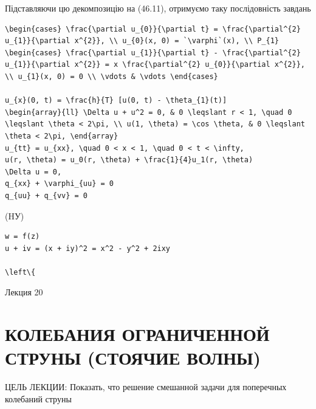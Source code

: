 \documentclass[
  ukrainian,
]{article}
\begin{document}
Підставляючи цю декомпозицію на (46.11), отримуємо таку послідовність
завдань

\begin{verbatim}
\begin{cases} \frac{\partial u_{0}}{\partial t} = \frac{\partial^{2} u_{1}}{\partial x^{2}}, \\ u_{0}(x, 0) = `\varphi`(x), \\ P_{1} \begin{cases} \frac{\partial u_{1}}{\partial t} - \frac{\partial^{2} u_{1}}{\partial x^{2}} = x \frac{\partial^{2} u_{0}}{\partial x^{2}}, \\ u_{1}(x, 0) = 0 \\ \vdots & \vdots \end{cases}

u_{x}(0, t) = \frac{h}{T} [u(0, t) - \theta_{1}(t)]
\begin{array}{ll} \Delta u + u^2 = 0, & 0 \leqslant r < 1, \quad 0 \leqslant \theta < 2\pi, \\ u(1, \theta) = \cos \theta, & 0 \leqslant \theta < 2\pi, \end{array}
u_{tt} = u_{xx}, \quad 0 < x < 1, \quad 0 < t < \infty,
u(r, \theta) = u_0(r, \theta) + \frac{1}{4}u_1(r, \theta)
\Delta u = 0,
q_{xx} + \varphi_{uu} = 0
q_{uu} + q_{vv} = 0
\end{verbatim}

(HУ)

\begin{verbatim}
w = f(z)
u + iv = (x + iy)^2 = x^2 - y^2 + 2ixy

\left\{
\end{verbatim}

Лекция 20

\section{КОЛЕБАНИЯ ОГРАНИЧЕННОЙ СТРУНЫ (СТОЯЧИЕ
ВОЛНЫ)}\label{ux43aux43eux43bux435ux431ux430ux43dux438ux44f-ux43eux433ux440ux430ux43dux438ux447ux435ux43dux43dux43eux439-ux441ux442ux440ux443ux43dux44b-ux441ux442ux43eux44fux447ux438ux435-ux432ux43eux43bux43dux44b}

ЦЕЛЬ ЛЕКЦИИ: Показать, что решение смешанной задачи для поперечных
колебаний струны
\end{document}
